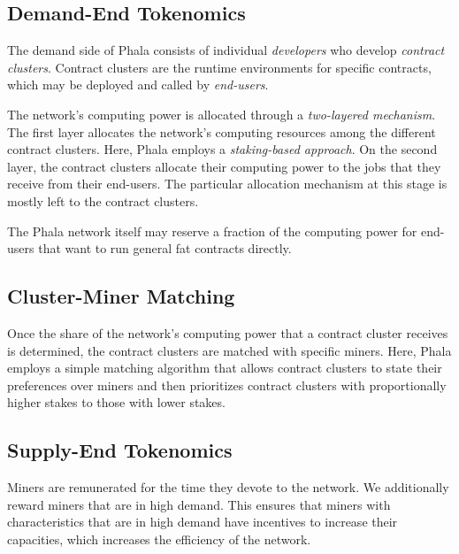 \documentclass[11pt, a4paper, twocolumn]{article}
\begin{document}

\subsection{Demand-End Tokenomics} 

The demand side of Phala consists of individual \textit{developers} who develop \textit{contract clusters}. Contract clusters are the runtime environments for specific contracts, which may be deployed and called by \textit{end-users}. %

The network's computing power is allocated through a \textit{two-layered mechanism}. The first layer allocates the network's computing resources among the different contract clusters. Here, Phala employs a \textit{staking-based approach}. On the second layer, the contract clusters allocate their computing power to the jobs that they receive from their end-users. The particular allocation mechanism at this stage is mostly left to the contract clusters.

The Phala network itself may reserve a fraction of the computing power for end-users that want to run general fat contracts directly.

\subsection{Cluster-Miner Matching}
Once the share of the network's computing power that a contract cluster receives is determined, the contract clusters are matched with specific miners. Here, Phala employs a simple matching algorithm that allows contract clusters to state their preferences over miners and then prioritizes contract clusters with proportionally higher stakes to those with lower stakes.

\subsection{Supply-End Tokenomics} 
Miners are remunerated for the time they devote to the network. We additionally reward miners that are in high demand. This ensures that miners with characteristics that are in high demand have incentives to increase their capacities, which increases the efficiency of the network.
\end{document}

